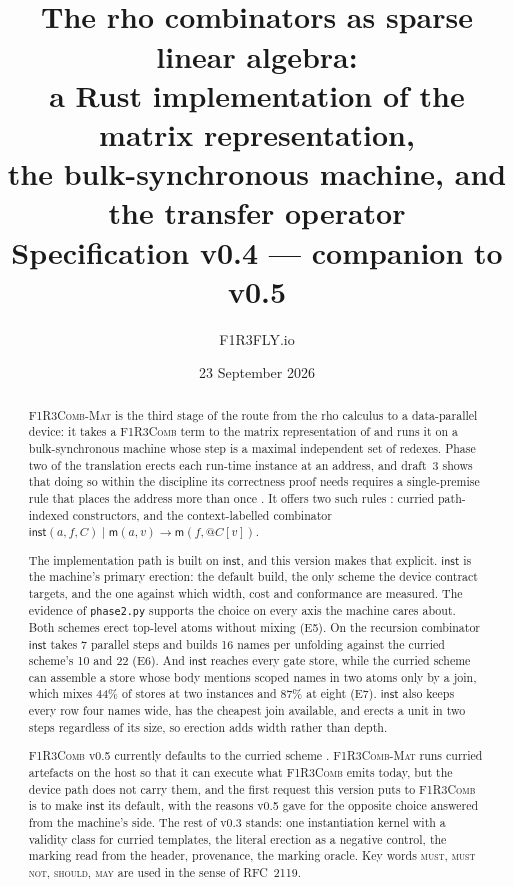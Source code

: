 \documentclass[11pt,a4paper]{article}
\title{\textbf{\Mat}\\[1mm]
\large The rho combinators as sparse linear algebra:\\
a Rust implementation of the matrix representation,\\
the bulk-synchronous machine, and the transfer operator\\[2mm]
\normalsize Specification v0.4 --- companion to \Comb{} v0.5}
\author{F1R3FLY.io}
\date{23 September 2026}
\makeatletter
\newcommand{\code}[1]{\texttt{#1}}
\newcommand{\Comb}{\textsc{F1R3Comb}}
\newcommand{\Mat}{\textsc{F1R3Comb-Mat}}
\newcommand{\MUST}{\textsc{must}}
\newcommand{\MUSTNOT}{\textsc{must not}}
\newcommand{\SHOULD}{\textsc{should}}
\newcommand{\MAY}{\textsc{may}}
\newcommand{\quo}[1]{@#1}
\newcommand{\red}{\longrightarrow}
\newcommand{\mm}{\mathsf{m}}
\theoremstyle{definition}
\theoremstyle{plain}
\newcommand{\inst}{\mathsf{inst}}
\makeatother
\begin{document}
\maketitle

\begin{abstract}
\noindent
\Mat{} is the third stage of the route from the rho calculus to a
data-parallel device: it takes a \Comb{} term to the matrix representation of
\cite{matnote} and runs it on a bulk-synchronous machine whose step is a
maximal independent set of redexes. Phase two of the translation erects each
run-time instance at an address, and draft~3 shows that doing so within the
discipline its correctness proof needs requires a single-premise rule that
places the address more than once \cite[Prop.~6.17, Lem.~6.19]{draft3}. It
offers two such rules \cite[\S6.7]{draft3}: curried path-indexed
constructors, and the context-labelled combinator
$\inst(a,f,C) \mid \mm(a,v) \red \mm(f,\quo{C[v]})$.

The implementation path is built on $\inst$, and this version makes that
explicit. $\inst$ is the machine's primary erection: the default build, the
only scheme the device contract targets, and the one against which width,
cost and conformance are measured. The evidence of \code{phase2.py} supports
the choice on every axis the machine cares about. Both schemes erect
top-level atoms without mixing (E5). On the recursion combinator $\inst$ takes
7 parallel steps and builds 16 names per unfolding against the curried
scheme's 10 and 22 (E6). And $\inst$ reaches every gate store, while the
curried scheme can assemble a store whose body mentions scoped names in two
atoms only by a join, which mixes 44\% of stores at two instances and 87\% at
eight (E7). $\inst$ also keeps every row four names wide, has the cheapest
join available, and erects a unit in two steps regardless of its size, so
erection adds width rather than depth.

\Comb{} v0.5 currently defaults to the curried scheme
\cite[Dec.~5.19]{combspec}. \Mat{} runs curried artefacts on the host so that
it can execute what \Comb{} emits today, but the device path does not carry
them, and the first request this version puts to \Comb{} is to make $\inst$
its default, with the reasons v0.5 gave for the opposite choice answered
from the machine's side. The rest of v0.3 stands: one instantiation kernel
with a validity class for curried templates, the literal erection as a
negative control, the marking read from the header, provenance, the marking
oracle.
Key words \MUST, \MUSTNOT, \SHOULD, \MAY{} are used in the sense of RFC~2119.
\end{abstract}
\end{document}
